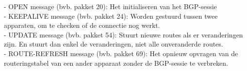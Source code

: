 - OPEN message (bvb. pakket 20): Het initialiseren van het BGP-sessie\\
- KEEPALIVE message (bvb. pakket 24): Worden gestuurd tussen twee apparaten, om te checken of de connectie nog werkt.\\
- UPDATE message (bvb. pakket 54):  Stuurt nieuwe routes als er veranderingen zijn. En stuurt dan enkel de veranderingen, niet alle onveranderde routes.\\
- ROUTE-REFRESH message (bvb. pakket 69): Het opnieuw opvragen van de routeringstabel van een ander apparaat zonder de BGP-sessie te verbreken.
